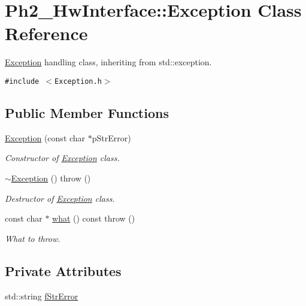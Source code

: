 \hypertarget{class_ph2___hw_interface_1_1_exception}{
\section{Ph2\_\-Hw\-Interface::Exception Class Reference}
\label{class_ph2___hw_interface_1_1_exception}
}
\hyperlink{class_ph2___hw_interface_1_1_exception}{Exception} handling class, inheriting from std::exception.  


{\tt \#include $<$Exception.h$>$}

\subsection*{Public Member Functions}
\begin{CompactItemize}
\item 
\hyperlink{class_ph2___hw_interface_1_1_exception_9ac7df51fe36dfb65ff24ca975ec846f}{Exception} (const char $\ast$p\-Str\-Error)
\begin{CompactList}\small\item\em Constructor of \hyperlink{class_ph2___hw_interface_1_1_exception}{Exception} class. \item\end{CompactList}\item 
\hyperlink{class_ph2___hw_interface_1_1_exception_667217cdbe920cb69842a3d3afb69d35}{$\sim$Exception} ()  throw ()
\begin{CompactList}\small\item\em Destructor of \hyperlink{class_ph2___hw_interface_1_1_exception}{Exception} class. \item\end{CompactList}\item 
const char $\ast$ \hyperlink{class_ph2___hw_interface_1_1_exception_8db77fef785111589956a21598b748e0}{what} () const   throw ()
\begin{CompactList}\small\item\em What to throw. \item\end{CompactList}\end{CompactItemize}
\subsection*{Private Attributes}
\begin{CompactItemize}
\item 
std::string \hyperlink{class_ph2___hw_interface_1_1_exception_a060af06e0614e117e2902f41e57e179}{f\-Str\-Error}
\end{CompactItemize}


